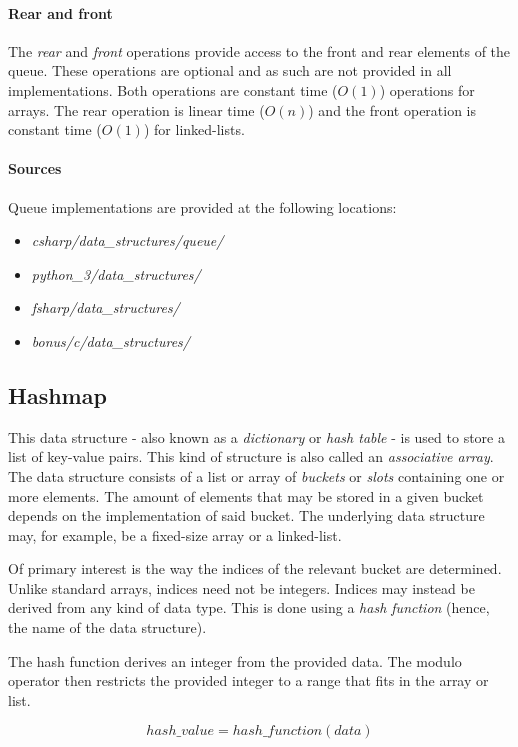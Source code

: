 \documentclass{article}
\begin{document}
\paragraph{Rear and front}
The {\em rear} and {\em front} operations provide access to the front and rear elements of the queue.
These operations are optional and as such are not provided in all implementations.
Both operations are constant time (\(O(1)\)) operations for arrays.
The rear operation is linear time (\(O(n)\)) and the front operation is constant time (\(O(1)\)) for linked-lists.

\paragraph{Sources}
Queue implementations are provided at the following locations:
\begin{itemize}
\item{{\em csharp/data\_structures/queue/}}
\item{{\em python\_3/data\_structures/}}
\item{{\em fsharp/data\_structures/}}
\item{{\em bonus/c/data\_structures/}}
\end{itemize}


\newpage


\subsection{Hashmap}
This data structure - also known as a {\em dictionary} or {\em hash table} -
is used to store a list of key-value pairs. This kind of structure is also called an {\em associative array}.
The data structure consists of a list or array of {\em buckets} or {\em slots} containing one or
more elements. The amount of elements that may be stored in a given bucket depends on the implementation of said
bucket. The underlying data structure may, for example, be a fixed-size array or a linked-list.

Of primary interest is the way the indices of the relevant bucket are determined.
Unlike standard arrays, indices need not be integers. Indices may instead be derived from any kind of data type.
This is done using a {\em hash function} (hence, the name of the data structure).

The hash function derives an integer from the provided data. The modulo operator then restricts the provided
integer to a range that fits in the array or list.

\begin{equation}
  hash\_value = hash\_function(data)
\end{equation}
\end{document}
